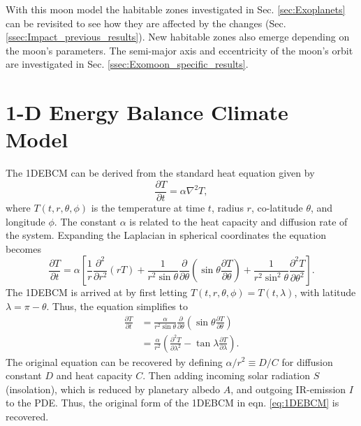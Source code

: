 \documentclass[12pt, onecolumn]{revtex4-2}    %
\newcommand{\partialderiv}[2]{\frac{\partial {#1}}{\partial {#2}}}
\newcommand{\partialderivsecnd}[2]{\frac{\partial^2 {#1}}{\partial {#2}^2}}
\begin{document}
With this moon model the habitable zones investigated in Sec. \ref{sec:Exoplanets} can be revisited to see how they are affected by the changes (Sec. \ref{ssec:Impact_previous_results}).
New habitable zones also emerge depending on the moon's parameters.
The semi-major axis and eccentricity of the moon's orbit are investigated in Sec. \ref{ssec:Exomoon_specific_results}.

\section{1-D Energy Balance Climate Model}\label{sec:1DEBCM}
%
The 1DEBCM can be derived from the standard heat equation given by
\begin{equation}
  \partialderiv{T}{t} = \alpha \nabla^2 T,
  \label{eq:heat_eqn}
\end{equation}
where $T(t, r, \theta, \phi)$ is the temperature at time $t$, radius $r$, co-latitude $\theta$, and longitude $\phi$.
The constant $\alpha$ is related to the heat capacity and diffusion rate of the system.
Expanding the Laplacian in spherical coordinates the equation becomes
\begin{equation}
  \partialderiv{T}{t} = \alpha \left[\frac{1}{r} \partialderivsecnd{}{r} (r T)
    + \frac{1}{r^2 \sin\theta} \partialderiv{}{\theta}\left(\sin\theta \partialderiv{T}{\theta}\right)
    + \frac{1}{r^2 \sin^2\theta} \partialderivsecnd{T}{\theta} \right]. 
    \label{eq:FullyExpandedHeatEqn}
\end{equation}
The 1DEBCM is arrived at by first letting $T(t, r, \theta, \phi) = T(t, \lambda)$, with latitude $\lambda = \pi - \theta$. Thus, the equation simplifies to
\begin{equation}
  \begin{split}
    \partialderiv{T}{t} & = \frac{\alpha}{r^2 \sin\theta} \partialderiv{}{\theta}\left(\sin\theta \partialderiv{T}{\theta}\right)   \\
                        & = \frac{\alpha}{r^2} \left(\partialderivsecnd{T}{\lambda} - \tan\lambda \partialderiv{T}{\lambda}\right).
  \end{split}
  \label{eq:1DEBCM_kernel}
\end{equation}
The original equation can be recovered by defining $\alpha / r^2 \equiv D / C$ for diffusion constant $D$ and heat capacity $C$.
Then adding incoming solar radiation $S$ (insolation), which is reduced by planetary albedo $A$, and outgoing IR-emission $I$ to the PDE.
Thus, the original form of the 1DEBCM in eqn. \eqref{eq:1DEBCM} is recovered.
\end{document}
